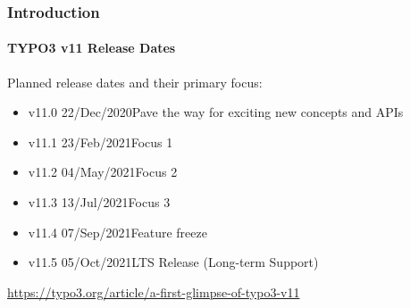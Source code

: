%

\begin{frame}[fragile]
	\frametitle{Introduction}
	\framesubtitle{TYPO3 v11 Release Dates}

	Planned release dates and their primary focus:

	\begin{itemize}
		\item
			\begingroup
				\color{typo3orange}
				v11.0 \tabto{1.1cm}22/Dec/2020\tabto{3.4cm}Pave the way for exciting new concepts and APIs
			\endgroup
		\item v11.1 \tabto{1.1cm}23/Feb/2021\tabto{3.4cm}Focus 1
		\item v11.2 \tabto{1.1cm}04/May/2021\tabto{3.4cm}Focus 2
		\item v11.3 \tabto{1.1cm}13/Jul/2021\tabto{3.4cm}Focus 3
		\item v11.4 \tabto{1.1cm}07/Sep/2021\tabto{3.4cm}Feature freeze
		\item v11.5 \tabto{1.1cm}05/Oct/2021\tabto{3.4cm}LTS Release (Long-term Support)

	\end{itemize}

	\smaller
		\url{https://typo3.org/article/a-first-glimpse-of-typo3-v11}
	\normalsize

\end{frame}

